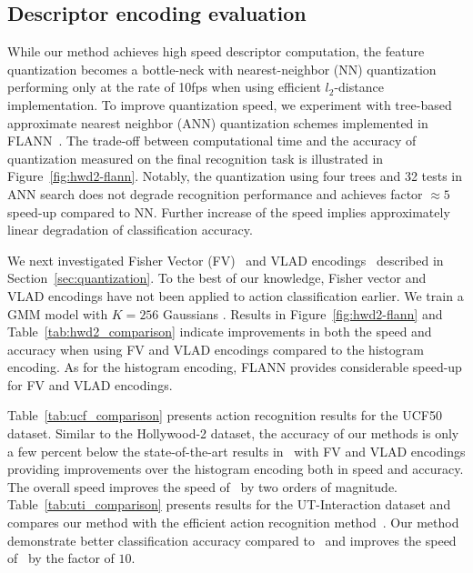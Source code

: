 \documentclass[10pt,twocolumn,letterpaper]{article}
\begin{document}
\subsection{Descriptor encoding evaluation}
\label{subsec:descencimprov}
While our method achieves high speed descriptor computation, the feature quantization becomes a bottle-neck with nearest-neighbor (NN) quantization performing only at the rate of 10fps when using efficient $l_2$-distance implementation. To improve quantization speed, we experiment with tree-based approximate nearest neighbor (ANN) quantization schemes implemented in FLANN~\cite{Muja09}. The trade-off between computational time and the accuracy of quantization measured on the final recognition task is illustrated in Figure~\ref{fig:hwd2-flann}. Notably, the quantization using four trees and 32 tests in ANN search does not degrade recognition performance and achieves factor $\approx5$ speed-up compared to NN. Further increase of the speed implies approximately linear degradation of classification accuracy. 

We next investigated Fisher Vector (FV)~\cite{Perronnin12} and VLAD encodings~\cite{Jegou10} described in Section~\ref{sec:quantization}. 
%
To the best of our knowledge, Fisher vector and VLAD encodings have not been applied to action classification earlier. We train a GMM model with $K=256$ Gaussians \cite{Jegou12}. Results in Figure~\ref{fig:hwd2-flann} and Table~\ref{tab:hwd2_comparison} indicate improvements in both the speed and accuracy when using FV and VLAD encodings compared to the histogram encoding. As for the histogram encoding, FLANN provides considerable speed-up for FV and VLAD encodings.

Table~\ref{tab:ucf_comparison} presents action recognition results for the UCF50 dataset. Similar to the Hollywood-2 dataset, the accuracy of our methods is only a few percent below the state-of-the-art results in~\cite{Wang12} with FV and VLAD encodings providing improvements over the histogram encoding both in speed and accuracy. The overall speed improves the speed of~\cite{Wang12} by two orders of magnitude. Table~\ref{tab:uti_comparison} presents results for the UT-Interaction dataset and compares our method with the efficient action recognition method~\cite{Yu10}. Our method demonstrate better classification accuracy compared to~\cite{Yu10} and improves the speed of~\cite{Yu10} by the factor of $10$.
\end{document}
